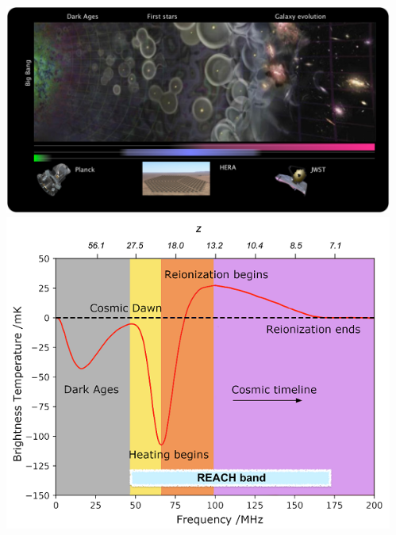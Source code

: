 \documentclass[aspectratio=169]{beamer}
\begin{document}
\begin{frame}
\begin{columns}
\begin{itemize}
        \end{itemize}
        \includegraphics[width=\textwidth]{figures/21cm_1.png}
        \includegraphics[width=\textwidth]{figures/21cm.png}
    \end{columns}
\end{frame}
\end{document}
